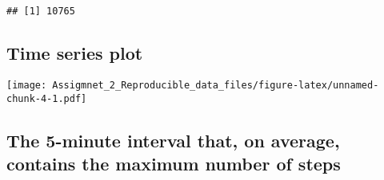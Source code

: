 \documentclass[]{article}
\newenvironment{Shaded}{\begin{snugshade}}{\end{snugshade}}
\newcommand{\KeywordTok}[1]{\textcolor[rgb]{0.13,0.29,0.53}{\textbf{#1}}}
\newcommand{\DataTypeTok}[1]{\textcolor[rgb]{0.13,0.29,0.53}{#1}}
\newcommand{\StringTok}[1]{\textcolor[rgb]{0.31,0.60,0.02}{#1}}
\newcommand{\OperatorTok}[1]{\textcolor[rgb]{0.81,0.36,0.00}{\textbf{#1}}}
\newcommand{\NormalTok}[1]{#1}
\begin{document}
\begin{Shaded}
\end{Shaded}

\begin{verbatim}
## [1] 10765
\end{verbatim}

\subsection{Time series plot}\label{time-series-plot}

\begin{Shaded}
\end{Shaded}

\texttt{[image: Assigmnet\_2\_Reproducible\_data\_files/figure-latex/unnamed-chunk-4-1.pdf]}

\subsection{The 5-minute interval that, on average, contains the maximum
number of
steps}\label{the-5-minute-interval-that-on-average-contains-the-maximum-number-of-steps}

\begin{Shaded}
\end{Shaded}
\end{document}
